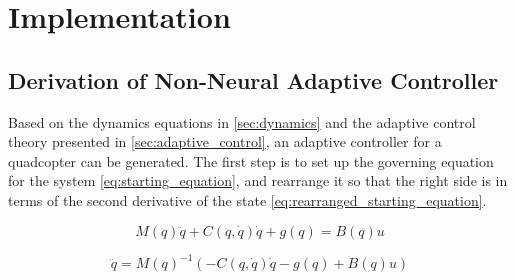 \documentclass[letterpaper,12pt,titlepage,oneside,final]{book}
\begin{document}




\chapter{Implementation} \label{chap:implementation}

\section{Derivation of Non-Neural Adaptive Controller} %

Based on the dynamics equations in \autoref{sec:dynamics} and the adaptive control theory presented in \autoref{sec:adaptive_control}, an adaptive controller for a quadcopter can be generated.
The first step is to set up the governing equation for the system \eqref{eq:starting_equation}, and rearrange it so that the right side is in terms of the second derivative of the state \eqref{eq:rearranged_starting_equation}.


\begin{equation} \label{eq:starting_equation}
M(q)\ddot{q} + C(q,\dot{q})\dot{q} + g(q) = B(q)u
\end{equation}

\begin{equation} \label{eq:rearranged_starting_equation}
\ddot{q} = M(q)^{-1}(-C(q,\dot{q})\dot{q} - g(q) + B(q)u)
\end{equation}
\end{document}
